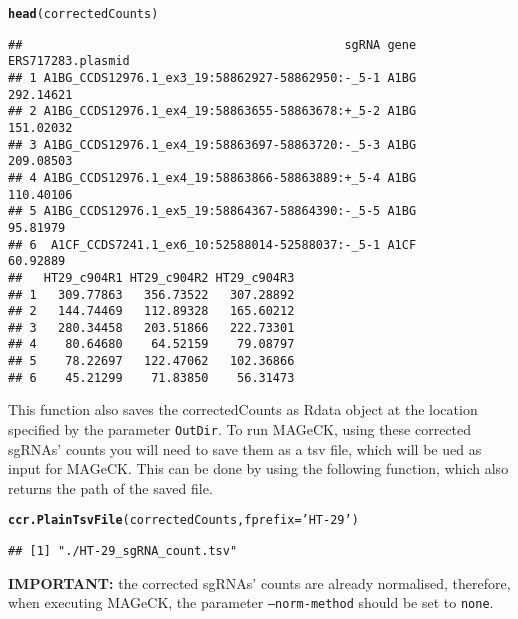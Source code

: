 \documentclass{article}\usepackage[]{graphicx}\usepackage[]{color}
\makeatletter
\newcommand{\hlstr}[1]{\textcolor[rgb]{0.192,0.494,0.8}{#1}}%
\newcommand{\hlstd}[1]{\textcolor[rgb]{0.345,0.345,0.345}{#1}}%
\newcommand{\hlkwc}[1]{\textcolor[rgb]{0.333,0.667,0.333}{#1}}%
\newcommand{\hlkwd}[1]{\textcolor[rgb]{0.737,0.353,0.396}{\textbf{#1}}}%
\newenvironment{kframe}{%
 \def\at@end@of@kframe{}%
 \ifinner\ifhmode%
  \def\at@end@of@kframe{\end{minipage}}%
  \begin{minipage}{\columnwidth}%
 \fi\fi%
 \def\FrameCommand##1{\hskip\@totalleftmargin \hskip-\fboxsep
 \colorbox{shadecolor}{##1}\hskip-\fboxsep
     \hskip-\linewidth \hskip-\@totalleftmargin \hskip\columnwidth}%
 \MakeFramed {\advance\hsize-\width
   \@totalleftmargin\z@ \linewidth\hsize
   \@setminipage}}%
 {\par\unskip\endMakeFramed%
 \at@end@of@kframe}
\newenvironment{knitrout}{}{} %
\makeatother
\begin{document}
\begin{knitrout}
\color{fgcolor}\begin{kframe}
\begin{alltt}
\hlkwd{head}\hlstd{(correctedCounts)}
\end{alltt}
\begin{verbatim}
##                                             sgRNA gene ERS717283.plasmid
## 1 A1BG_CCDS12976.1_ex3_19:58862927-58862950:-_5-1 A1BG         292.14621
## 2 A1BG_CCDS12976.1_ex4_19:58863655-58863678:+_5-2 A1BG         151.02032
## 3 A1BG_CCDS12976.1_ex4_19:58863697-58863720:-_5-3 A1BG         209.08503
## 4 A1BG_CCDS12976.1_ex4_19:58863866-58863889:+_5-4 A1BG         110.40106
## 5 A1BG_CCDS12976.1_ex5_19:58864367-58864390:-_5-5 A1BG          95.81979
## 6  A1CF_CCDS7241.1_ex6_10:52588014-52588037:-_5-1 A1CF          60.92889
##   HT29_c904R1 HT29_c904R2 HT29_c904R3
## 1   309.77863   356.73522   307.28892
## 2   144.74469   112.89328   165.60212
## 3   280.34458   203.51866   222.73301
## 4    80.64680    64.52159    79.08797
## 5    78.22697   122.47062   102.36866
## 6    45.21299    71.83850    56.31473
\end{verbatim}
\end{kframe}
\end{knitrout}

This function also saves the correctedCounts as Rdata object at the location specified by the parameter \texttt{OutDir}.
To run MAGeCK, using these corrected sgRNAs' counts you will need to save them as a tsv file, which will be ued as input for MAGeCK. This can be done by using the following function, which also returns the path of the saved file.

\begin{knitrout}
\color{fgcolor}\begin{kframe}
\begin{alltt}
\hlkwd{ccr.PlainTsvFile}\hlstd{(correctedCounts,}\hlkwc{fprefix} \hlstd{=} \hlstr{'HT-29'}\hlstd{)}
\end{alltt}
\begin{verbatim}
## [1] "./HT-29_sgRNA_count.tsv"
\end{verbatim}
\end{kframe}
\end{knitrout}


\textbf{IMPORTANT:} the corrected sgRNAs' counts are already normalised,
therefore, when executing MAGeCK, the parameter \texttt{--norm-method} should be set to \texttt{none}.
\end{document}
